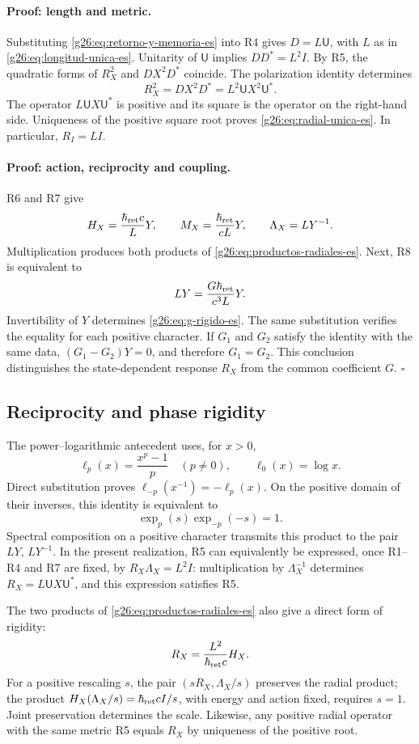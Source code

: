 \paragraph{Proof: length and metric.}
Substituting \eqref{g26:eq:retorno-y-memoria-es} into R4 gives \(D=L\mathsf U\), with \(L\) as in \eqref{g26:eq:longitud-unica-es}. Unitarity of \(\mathsf U\) implies \(DD^*=L^2I\). By R5, the quadratic forms of \(R_X^2\) and \(DX^2D^*\) coincide. The polarization identity determines
\[
 R_X^2=DX^2D^*=L^2\mathsf U X^2\mathsf U^*.
\]
The operator \(L\mathsf U X\mathsf U^*\) is positive and its square is the operator on the right-hand side. Uniqueness of the positive square root proves \eqref{g26:eq:radial-unica-es}. In particular, \(R_I=LI\).

\paragraph{Proof: action, reciprocity and coupling.}
R6 and R7 give
\[
 H_X=\frac{\hbar_{\rm ret}c}{L}Y,
 \qquad M_X=\frac{\hbar_{\rm ret}}{cL}Y,
 \qquad \Lambda_X=LY^{-1}.
\]
Multiplication produces both products of \eqref{g26:eq:productos-radiales-es}. Next, R8 is equivalent to
\[
 LY=\frac{G\hbar_{\rm ret}}{c^3L}Y.
\]
Invertibility of \(Y\) determines \eqref{g26:eq:g-rigido-es}. The same substitution verifies the equality for each positive character. If \(G_1\) and \(G_2\) satisfy the identity with the same data, \((G_1-G_2)Y=0\), and therefore \(G_1=G_2\). This conclusion distinguishes the state-dependent response \(R_X\) from the common coefficient \(G\). \hfill\(\square\)

\subsection{Reciprocity and phase rigidity}

The power--logarithmic antecedent uses, for \(x>0\),
\[
 \ell_p(x)=\frac{x^p-1}{p}\quad(p\ne0),
 \qquad \ell_0(x)=\log x.
\]
Direct substitution proves \(\ell_{-p}(x^{-1})=-\ell_p(x)\). On the positive domain of their inverses, this identity is equivalent to
\[
 \exp_p(s)\exp_{-p}(-s)=1.
\]
Spectral composition on a positive character transmits this product to the pair \(LY\), \(LY^{-1}\). In the present realization, R5 can equivalently be expressed, once R1--R4 and R7 are fixed, by \(R_X\Lambda_X=L^2I\): multiplication by \(\Lambda_X^{-1}\) determines \(R_X=L\mathsf U X\mathsf U^*\), and this expression satisfies R5.

The two products of \eqref{g26:eq:productos-radiales-es} also give a direct form of rigidity:
\begin{equation}
 R_X=\frac{L^2}{\hbar_{\rm ret}c}H_X.
 \label{g26:eq:proporcion-operadores-es}
\end{equation}
For a positive rescaling \(s\), the pair \((sR_X,\Lambda_X/s)\) preserves the radial product; the product \(H_X(\Lambda_X/s)=\hbar_{\rm ret}cI/s\), with energy and action fixed, requires \(s=1\). Joint preservation determines the scale. Likewise, any positive radial operator with the same metric R5 equals \(R_X\) by uniqueness of the positive root.

